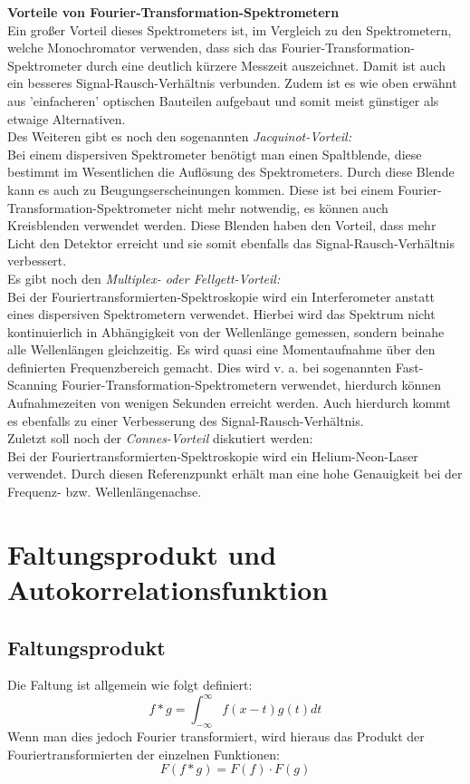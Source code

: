 \textbf{Vorteile von Fourier-Transformation-Spektrometern}\\
Ein großer Vorteil dieses Spektrometers ist, im Vergleich zu den Spektrometern, welche Monochromator 
verwenden, dass sich das Fourier-Transformation-Spektrometer durch eine deutlich kürzere Messzeit auszeichnet. Damit 
ist auch ein besseres Signal-Rausch-Verhältnis verbunden. Zudem ist es wie oben erwähnt aus 'einfacheren'
optischen Bauteilen aufgebaut und somit meist günstiger als etwaige Alternativen.\\
Des Weiteren gibt es noch den sogenannten \textit{Jacquinot-Vorteil:}\\
Bei einem dispersiven Spektrometer benötigt man einen Spaltblende, diese bestimmt 
im Wesentlichen die Auflösung des Spektrometers. Durch diese Blende kann es 
auch zu Beugungserscheinungen kommen. Diese ist bei einem
Fourier-Transformation-Spektrometer nicht mehr notwendig, es können auch Kreisblenden verwendet werden. 
Diese Blenden haben den Vorteil, dass mehr Licht den Detektor erreicht und sie 
somit ebenfalls das Signal-Rausch-Verhältnis verbessert.\\
Es gibt noch den \textit{Multiplex- oder Fellgett-Vorteil:}\\
Bei der Fouriertransformierten-Spektroskopie wird ein Interferometer anstatt eines dispersiven Spektrometern verwendet.
Hierbei wird das Spektrum nicht kontinuierlich in Abhängigkeit von der Wellenlänge gemessen, 
sondern beinahe alle Wellenlängen gleichzeitig.
Es wird quasi eine Momentaufnahme über den definierten Frequenzbereich gemacht. 
Dies wird v. a. bei sogenannten 
Fast-Scanning Fourier-Transformation-Spektrometern verwendet, hierdurch können Aufnahmezeiten 
von wenigen Sekunden erreicht werden.
Auch hierdurch kommt es ebenfalls zu einer Verbesserung des Signal-Rausch-Verhältnis.\\
Zuletzt soll noch der \textit{Connes-Vorteil} diskutiert werden:\\
Bei der Fouriertransformierten-Spektroskopie wird ein Helium-Neon-Laser verwendet. 
Durch diesen Referenzpunkt erhält man eine hohe Genauigkeit bei 
der Frequenz- bzw. Wellenlängenachse. \citep[vgl.][]{wikiFTIR, Zusatzliteratur}

\section{Faltungsprodukt und Autokorrelationsfunktion}
\subsection{Faltungsprodukt}
Die Faltung ist allgemein wie folgt definiert:
\begin{equation}
    f * g = \int_{- \infty}^{\infty} f(x-t) g(t) dt
\end{equation}
Wenn man dies jedoch Fourier transformiert, wird hieraus das Produkt der Fouriertransformierten der einzelnen Funktionen:
\begin{equation}
    F(f * g) = F(f) \cdot F(g)
\end{equation}
\citep[vgl.][]{Zusatzliteratur} 

